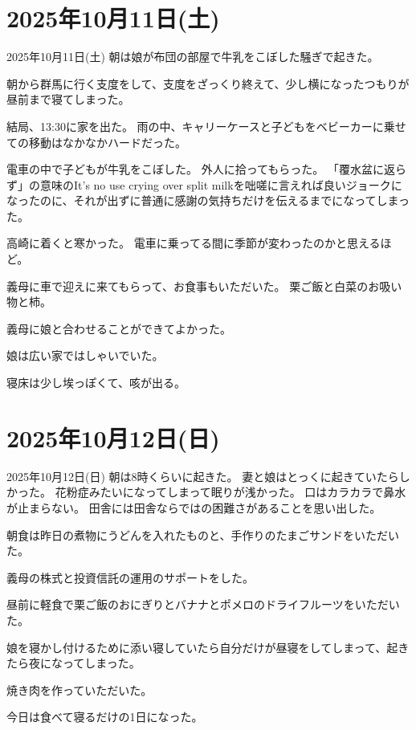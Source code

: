 \documentclass[dvipdfmx, autodetect-engine, aspectratio=169, 10.5pt]{beamer}
\begin{document}
\section{2025年10月11日(土)}

\begin{frame}{2025年10月11日(土)}
	朝は娘が布団の部屋で牛乳をこぼした騒ぎで起きた。

	朝から群馬に行く支度をして、支度をざっくり終えて、少し横になったつもりが昼前まで寝てしまった。

	結局、13:30に家を出た。
	雨の中、キャリーケースと子どもをベビーカーに乗せての移動はなかなかハードだった。

	電車の中で子どもが牛乳をこぼした。
	外人に拾ってもらった。
	「覆水盆に返らず」の意味のIt's no use crying over split milkを咄嗟に言えれば良いジョークになったのに、それが出ずに普通に感謝の気持ちだけを伝えるまでになってしまった。

	高崎に着くと寒かった。
	電車に乗ってる間に季節が変わったのかと思えるほど。

	義母に車で迎えに来てもらって、お食事もいただいた。
	栗ご飯と白菜のお吸い物と柿。

	義母に娘と合わせることができてよかった。

	娘は広い家ではしゃいでいた。

	寝床は少し埃っぽくて、咳が出る。
\end{frame}

\section{2025年10月12日(日)}

\begin{frame}{2025年10月12日(日)}
	朝は8時くらいに起きた。
	妻と娘はとっくに起きていたらしかった。
	花粉症みたいになってしまって眠りが浅かった。
	口はカラカラで鼻水が止まらない。
	田舎には田舎ならではの困難さがあることを思い出した。

	朝食は昨日の煮物にうどんを入れたものと、手作りのたまごサンドをいただいた。

	義母の株式と投資信託の運用のサポートをした。

	昼前に軽食で栗ご飯のおにぎりとバナナとポメロのドライフルーツをいただいた。

	娘を寝かし付けるために添い寝していたら自分だけが昼寝をしてしまって、起きたら夜になってしまった。

	焼き肉を作っていただいた。

	今日は食べて寝るだけの1日になった。
\end{frame}
\end{document}
